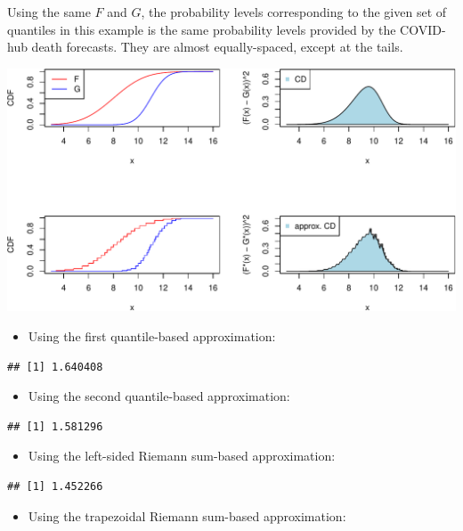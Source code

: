 \documentclass[
]{article}
\providecommand{\tightlist}{%
  \setlength{\itemsep}{0pt}\setlength{\parskip}{0pt}}
\begin{document}
Using the same \(F\) and \(G\), the probability levels corresponding to
the given set of quantiles in this example is the same probability
levels provided by the COVID-hub death forecasts. They are almost
equally-spaced, except at the tails.

\includegraphics{cd_approx_2_files/figure-latex/unnamed-chunk-20-1.pdf}

\begin{itemize}
\tightlist
\item
  Using the first quantile-based approximation:
\end{itemize}

\begin{verbatim}
## [1] 1.640408
\end{verbatim}

\begin{itemize}
\tightlist
\item
  Using the second quantile-based approximation:
\end{itemize}

\begin{verbatim}
## [1] 1.581296
\end{verbatim}

\begin{itemize}
\tightlist
\item
  Using the left-sided Riemann sum-based approximation:
\end{itemize}

\begin{verbatim}
## [1] 1.452266
\end{verbatim}

\begin{itemize}
\tightlist
\item
  Using the trapezoidal Riemann sum-based approximation:
\end{itemize}
\end{document}
